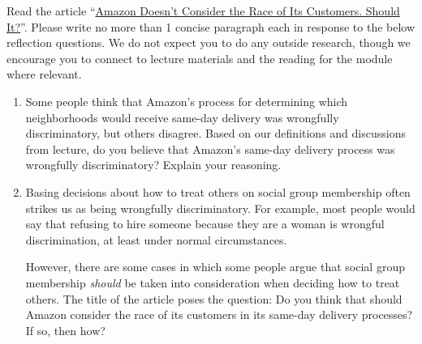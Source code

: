 \documentclass[submit]{harvardml}
\begin{document}
\begin{problem}

Read the article ``\href{https://www.bloomberg.com/graphics/2016-amazon-same-day/}{Amazon Doesn’t Consider the Race of Its Customers. Should It?}''. Please write no more than 1 concise paragraph each in response to the below reflection questions.  We do not expect you to do any outside research, though we encourage you to connect to lecture materials and the reading for the module where relevant.

\begin{enumerate}
    \item Some people think that Amazon’s process for determining which neighborhoods would receive same-day delivery was wrongfully discriminatory, but others disagree.  Based on our definitions and discussions from lecture, do you believe that Amazon's same-day delivery process was wrongfully discriminatory? Explain your reasoning.
    
    
    \item Basing decisions about how to treat others on social group membership often strikes us as being wrongfully discriminatory. For example, most people would say that refusing to hire someone because they are a woman is wrongful discrimination, at least under normal circumstances.
    
    However, there are some cases in which some people argue that social group membership \emph{should} be taken into consideration when deciding how to treat others.  The title of the article poses the question: Do you think that should Amazon consider the race of its customers in its same-day delivery processes? If so, then how? 
    
    
    

\end{enumerate}
\end{problem}
\end{document}
